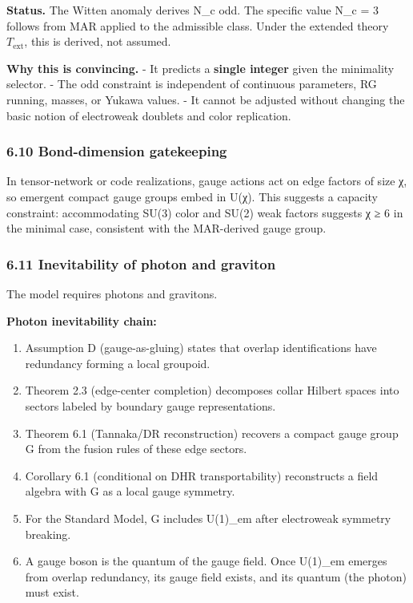 \documentclass[11pt,a4paper]{article}
\theoremstyle{remark}
\providecommand{\tightlist}{%
  \setlength{\itemsep}{0pt}\setlength{\parskip}{0pt}}
\begin{document}
\textbf{Status.} The Witten anomaly derives N\_c odd. The specific value N\_c = 3
follows from MAR applied to the admissible class. Under the extended theory
\(T_{\mathrm{ext}}\), this is derived, not assumed.

\textbf{Why this is convincing.}
- It predicts a \textbf{single integer} given the minimality selector.
- The odd constraint is independent of continuous parameters, RG running,
masses, or Yukawa values.
- It cannot be adjusted without changing the basic notion of electroweak
doublets and color replication.

\subsubsection{6.10 Bond-dimension gatekeeping}\label{bond-dimension-gatekeeping}

In tensor-network or code realizations, gauge actions act on edge factors of
size χ, so emergent compact gauge groups embed in U(χ). This suggests a
capacity constraint: accommodating SU(3) color and SU(2) weak factors suggests
χ ≥ 6 in the minimal case, consistent with the MAR-derived gauge group.

\subsubsection{6.11 Inevitability of photon and graviton}\label{inevitability-of-photon-and-graviton}

The model requires photons and gravitons.

\textbf{Photon inevitability chain:}

\begin{enumerate}
\def\labelenumi{\arabic{enumi}.}
\tightlist
\item
  Assumption D (gauge-as-gluing) states that overlap identifications have
  redundancy forming a local groupoid.
\item
  Theorem 2.3 (edge-center completion) decomposes collar Hilbert spaces into
  sectors labeled by boundary gauge representations.
\item
  Theorem 6.1 (Tannaka/DR reconstruction) recovers a compact gauge group G
  from the fusion rules of these edge sectors.
\item
  Corollary 6.1 (conditional on DHR transportability) reconstructs a field
  algebra with G as a local gauge symmetry.
\item
  For the Standard Model, G includes U(1)\_em after electroweak symmetry
  breaking.
\item
  A gauge boson is the quantum of the gauge field. Once U(1)\_em emerges from
  overlap redundancy, its gauge field exists, and its quantum (the photon) must
  exist.
\end{enumerate}
\end{document}
